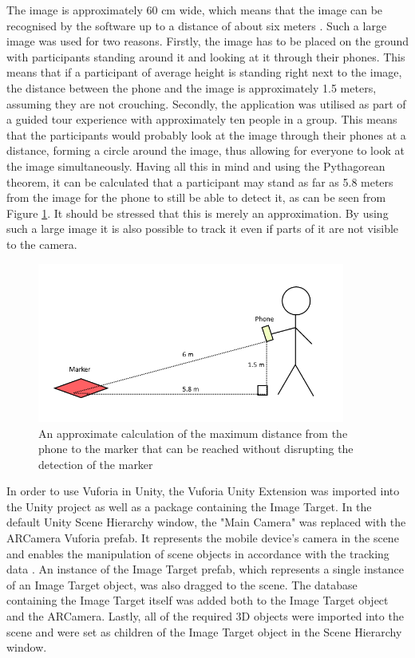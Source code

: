 The image is approximately 60 cm wide, which means that the image can be recognised by the software up to a distance of about six meters \cite{calculate_distance_from_image}. Such a large image was used for two reasons. Firstly, the image has to be placed on the ground with participants standing around it and looking at it through their phones. This means that if a participant of average height is standing right next to the image, the distance between the phone and the image is approximately 1.5 meters, assuming they are not crouching. Secondly, the application was utilised as part of a guided tour experience with approximately ten people in a group. This means that the participants would probably look at the image through their phones at a distance, forming a circle around the image, thus allowing for everyone to look at the image simultaneously. Having all this in mind and using the Pythagorean theorem, it can be calculated that a participant may stand as far as 5.8 meters from the image for the phone to still be able to detect it, as can be seen from Figure \ref{fig:imp3}. It should be stressed that this is merely an approximation. By using such a large image it is also possible to track it even if parts of it are not visible to the camera. 

\begin{figure}[h!]
    \centering
    \includegraphics[width=0.9\textwidth]{figures/imp3.png}
    \caption{An approximate calculation of the maximum distance from the phone to the marker that can be reached without disrupting the detection of the marker}\label{fig:imp3}
\end{figure}

In order to use Vuforia in Unity, the Vuforia Unity Extension was imported into the Unity project as well as a package containing the Image Target. In the default Unity Scene Hierarchy window, the "Main Camera" was replaced with the ARCamera Vuforia prefab. It represents the mobile device's camera in the scene and enables the manipulation of scene objects in accordance with the tracking data \cite{getting_started}. An instance of the Image Target prefab, which represents a single instance of an Image Target object, was also dragged to the scene. The database containing the Image Target itself was added both to the Image Target object and the ARCamera. Lastly, all of the required 3D objects were imported into the scene and were set as children of the Image Target object in the Scene Hierarchy window.


